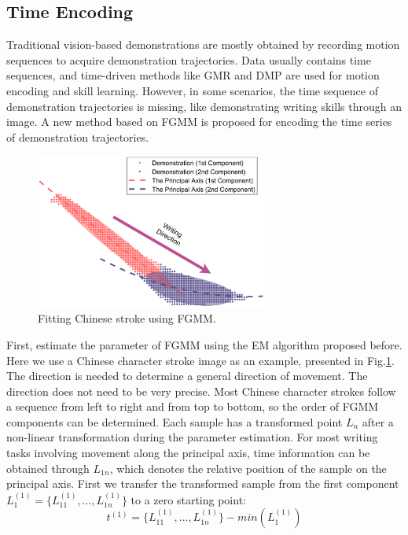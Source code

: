 \documentclass[conference]{IEEEtran}
\begin{document}
\subsection{Time Encoding}
Traditional vision-based demonstrations are mostly obtained by recording motion sequences to acquire demonstration trajectories. Data usually contains time sequences, and time-driven methods like GMR and DMP are used for motion encoding and skill learning. However, in some scenarios, the time sequence of demonstration trajectories is missing, like demonstrating writing skills through an image. A new method based on FGMM is proposed for encoding the time series of demonstration trajectories.
\begin{figure}[!t]
    \centering
    \includegraphics[width=3in]{./fig/fig3.pdf}
    \caption{Fitting Chinese stroke using FGMM.}
    \label{fig3}
\end{figure}

First, estimate the parameter of FGMM using the EM algorithm proposed before. Here we use a Chinese character stroke image as an example, presented in Fig.\ref{fig3}. The direction is needed to determine a general direction of movement. The direction does not need to be very precise. Most Chinese character strokes follow a sequence from left to right and from top to bottom, so the order of FGMM components can be determined. Each sample has a transformed point $L_n$ after a non-linear transformation during the parameter estimation. For most writing tasks involving movement along the principal axis, time information can be obtained through $L_{1n}$, which denotes the relative position of the sample on the principal axis. First we transfer the transformed sample from the first component $L_{1}^{(1)}=\{L_{11}^{(1)}, \hdots, L_{1n}^{(1)}\}$ to a zero starting point:
\begin{equation}
    t^{(1)}=\{L_{11}^{(1)}, \hdots, L_{1n}^{(1)}\}-min(L_{1}^{(1)})
\end{equation}
\end{document}
